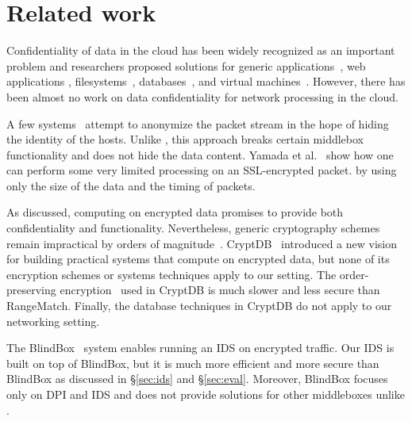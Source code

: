 
\section{Related work}\label{sec:related}

Confidentiality of data in the cloud has been widely recognized as an important problem and researchers proposed solutions for generic applications~\cite{Baumann:Haven}, web applications \cite{giffin:hails, Mylar},  filesystems~\cite{blaze:cfs, kallahalla:plutus, goh:sirius},  databases~\cite{popa:cryptdb},  and virtual machines~\cite{Zhang:CloudVisor}. However, there has been almost no work on data confidentiality for network processing in the cloud. 

A few systems~\cite{Vern:Anonymize03, Vern:Anonymize06} attempt to anonymize the packet stream in the hope of hiding the identity of the hosts.
Unlike \sys, this approach breaks certain middlebox functionality and does not hide the data content.
Yamada et al.~\cite{Yamada_IDS} show how one can perform some very limited processing on an 
SSL-encrypted packet.
     by using only the size of the data and the timing of packets. %


As discussed, computing on encrypted data promises to provide both confidentiality and functionality. Nevertheless, generic cryptography schemes~\cite{BSW11,gentry:fhe} remain impractical by orders of magnitude~\cite{gentry:fhe-aes-eprint}.
CryptDB~\cite{popa:cryptdb} introduced a new vision for building practical systems that compute on encrypted data, but none of its encryption schemes or systems techniques  apply to our setting.  The order-preserving encryption~\cite{boldyreva:ope} used in CryptDB is 
 much slower and less secure than RangeMatch. 
 Finally, the database techniques in CryptDB do not apply to our networking setting. 

The BlindBox~\cite{blindbox} system enables running an IDS on encrypted traffic. Our IDS is built on top of BlindBox, but it is much more efficient and more secure than BlindBox as discussed in \S\ref{sec:ids} and \S\ref{sec:eval}. Moreover, BlindBox focuses only on DPI and IDS and does not provide solutions for other middleboxes unlike \sys. %


